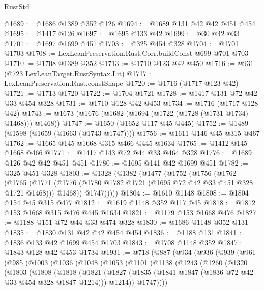 \begin{lexlean}{RustStd}
\begin{coremodule}
@1689 := @1686 @1389 @352 @126
@1694 := @1689 @131 @42 @42 @451 @454
@1695 := @1417 @126
@1697 := @1695 @133 @42
@1699 := @30 @42 @33
@1701 := @1697 @1699 @451
@1703 := @325 @454 @328
@1704 := @1701 @1703
@1708 := LexLeanPreservation.Rust.Corr.buildConst @699 @701 @703
@1710 := @1708 @1389 @352
@1713 := @1710 @123 @42 @450
@1716 := @931 (@723 LexLeanTarget.RustSyntax.Lit)
@1717 := LexLeanPreservation.Rust.constShape
@1720 := @1716 (@1717 @123 @42)
@1721 := @1713 @1720
@1722 := @1704 @1721
@1728 := @1417 @131 @72 @42 @33 @454 @328
@1731 := @1710 @128 @42 @453
@1734 := @1716 (@1717 @128 @42)
@1743 := @1673 (@1676 (@1682 (@1694 (@1722 (@1728 (@1731 @1734) @1468))) @1468))
@1747 := @1650 (@1652 @117 @45 @445)
@1752 := @1489 (@1598 (@1659 (@1663 (@1743 @1747))))
@1756 := @1611 @146 @45 @315 @467
@1762 := @1665 @145 @1668 @315 @466 @445 @1634
@1765 := @1412 @145 @1668 @466
@1771 := @1417 @143 @72 @44 @33 @464 @328
@1776 := @1689 @126 @42 @42 @451 @451
@1780 := @1695 @141 @42 @1699 @451
@1782 := @325 @451 @328
@1803 := @1328
    (@1382
      (@1477
        (@1752
          (@1756
            (@1762
              (@1765
                (@1771 (@1776 (@1780 @1782 @1721 (@1695 @72 @42 @33 @451 @328 @1721 @1468))) @1468))
              @1747)))))
@1804 := @1610 @1148
@1808 := @1804 @154 @45 @315 @477
@1812 := @1619 @1148 @352 @117 @45
@1818 := @1812 @153 @1668 @315 @476 @445 @1634
@1821 := @1179 @153 @1668 @476
@1827 := @1188 @151 @72 @44 @33 @474 @328
@1830 := @1686 @1148 @352 @131
@1835 := @1830 @131 @42 @42 @454 @454
@1836 := @1188 @131
@1841 := @1836 @133 @42 @1699 @454 @1703
@1843 := @1708 @1148 @352
@1847 := @1843 @128 @42 @453 @1734
@1931 := @718
    (@887
      (@934
        (@936
          (@939
            (@961
              (@985
                (@1003
                  (@1036
                    (@1048
                      (@1053
                        (@1101
                          (@1138
                            (@1243
                              (@1260
                                (@1320
                                  (@1803
                                    (@1808
                                      (@1818
                                        (@1821
                                          (@1827
                                            (@1835
                                              (@1841
                                                @1847
                                                (@1836 @72 @42 @33 @454 @328 @1847 @1214)))
                                            @1214))
                                        @1747))))

\end{coremodule}
\end{lexlean}
